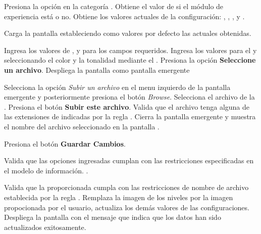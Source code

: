 \begin{UCtrayectoria}%
   

  \Actor Presiona la opción {\bf {}} en la categoría
         . 
  \Sistema Obtiene el valor de si el módulo de experiencia está  o no. 
  \Sistema Obtiene los valores actuales de la configuración:
           ,
           ,
           ,
            y
           .

  \Sistema Carga la pantalla  estableciendo como valores por defecto
           las  actuales obtenidas.

  \Actor Ingresa los valores de ,
          y
          para los campos requeridos.
         \label{CU-E02-1.formulario}
  \Actor Ingresa los valores para el  y
          seleccionando el color y la
         tonalidad mediante el . 
         \label{CU-E02-1.color}
  \Actor Presiona la opción {\bf Seleccione un archivo}. 
  \Sistema Despliega la pantalla  como pantalla emergente 
           \label{CU-E02-1.seleccion-archivo}

  \Actor Selecciona la opción {\it Subir un archivo} en el menu izquierdo de la
         pantalla emergente y posteriormente presiona el botón {\it Browse}.
  \Actor Selecciona el archivo de la .
  \Actor Presiona el botón {\bf Subir este archivo}.
  \Sistema Valida que el archivo tenga alguna de las extensiones de indicadas
           por la regla . 
  \Sistema Cierra la pantalla emergente y muestra el nombre del archivo seleccionado
           en la pantalla .


  \Actor Presiona el botón {\bf Guardar Cambios}.  \label{CU-E02-1.validacion}

  \Sistema Valida que las opciones ingresadas cumplan con las restricciones
           especificadas en el modelo de información. .

  \Sistema Valida que la  proporcionada cumpla con
           las restricciones de nombre de archivo establecida por la regla
           . 
  \Sistema Remplaza la imagen de los niveles por la imagen propocionada por el usuario,
           actualiza los demás valores de las configuraciones. 
  \Sistema Despliega la pantalla  con el mensaje que indica que
           los datos han sido actualizados exitosamente.
\end{UCtrayectoria}

